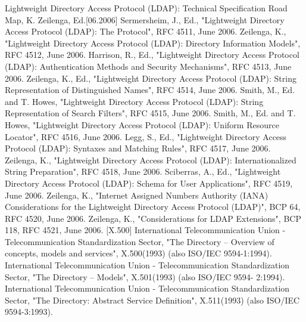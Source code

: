 Lightweight Directory Access Protocol (LDAP): Technical
Specification Road Map, K. Zeilenga, Ed.[06.2006]
 Sermersheim, J., Ed., "Lightweight Directory Access
                 Protocol (LDAP): The Protocol", RFC 4511, June 2006.
 Zeilenga, K., "Lightweight Directory
   Access Protocol (LDAP): Directory Information Models", RFC 4512, June
                 2006.
 Harrison, R., Ed., "Lightweight Directory
   Access Protocol (LDAP): Authentication Methods and Security
                 Mechanisms", RFC 4513, June 2006.
 Zeilenga, K., Ed., "Lightweight Directory
   Access Protocol (LDAP): String Representation of Distinguished
                 Names", RFC 4514, June 2006.
 Smith, M., Ed. and T. Howes, "Lightweight
   Directory Access Protocol (LDAP): String Representation of Search
                 Filters", RFC 4515, June 2006.
 Smith, M., Ed. and T. Howes, "Lightweight
   Directory Access Protocol (LDAP): Uniform Resource Locator", RFC
                 4516, June 2006.
  Legg, S., Ed., "Lightweight Directory
   Access Protocol (LDAP): Syntaxes and Matching Rules", RFC 4517, June
                 2006.
 Zeilenga, K., "Lightweight Directory
   Access Protocol (LDAP): Internationalized String Preparation", RFC
                 4518, June 2006.
 Sciberras, A., Ed., "Lightweight
   Directory Access Protocol (LDAP): Schema for User Applications", RFC
                 4519, June 2006.
 Zeilenga, K., "Internet Assigned Numbers
   Authority (IANA) Considerations for the Lightweight Directory
                 Access Protocol (LDAP)", BCP 64, RFC 4520, June 2006.
 Zeilenga, K., "Considerations for LDAP
   Extensions", BCP 118, RFC 4521, June 2006.
 [X.500]       International Telecommunication Union -
                 Telecommunication Standardization Sector, "The
                 Directory -- Overview of concepts, models and
                 services", X.500(1993) (also ISO/IEC 9594-1:1994).
 International Telecommunication Union -
                 Telecommunication Standardization Sector, "The
                 Directory -- Models", X.501(1993) (also ISO/IEC 9594-
                 2:1994).
 International Telecommunication Union -
                 Telecommunication Standardization Sector, "The
                 Directory: Abstract Service Definition", X.511(1993)
                 (also ISO/IEC 9594-3:1993).
